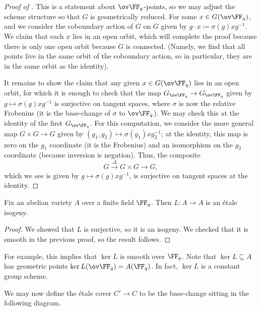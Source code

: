 \documentclass[../notes.tex]{subfiles}
\begin{document}
\begin{proof}[Proof of ]
	This is a statement about $\ov\FF_q$-points, so we may adjust the scheme structure so that $G$ is geometrically reduced. For some $x\in G(\ov\FF_q)$, and we consider the coboundary action of $G$ on $G$ given by $g\cdot x\coloneqq \sigma(g)xg^{-1}$. We claim that each $x$ lies in an open orbit, which will complete the proof because there is only one open orbit because $G$ is connected. (Namely, we find that all points live in the same orbit of the coboundary action, so in particular, they are in the same orbit as the identity).

	It remains to show the claim that any given $x\in G(\ov\FF_q)$ lies in an open orbit, for which it is enough to check that the map $G_{\ov\FF_q}\to G_{\ov\FF_q}$ given by $g\mapsto\sigma(g)xg^{-1}$ is surjective on tangent spaces, where $\sigma$ is now the relative Frobenius (it is the base-change of $\sigma$ to $\ov\FF_q$). We may check this at the identity of the first $G_{\ov\FF_q}$. For this computation, we consider the more general map $G\times G\to G$ given by $(g_1,g_2)\mapsto\sigma(g_1)xg_2^{-1}$; at the identity, this map is zero on the $g_1$ coordinate (it is the Frobenius) and an isomorphism on the $g_2$ coordinate (because inversion is negation). Thus, the composite
	\[G\stackrel\Delta\to G\times G\to G,\]
	which we see is given by $g\mapsto\sigma(g)xg^{-1}$, is surjective on tangent spaces at the identity.
\end{proof}
\begin{corollary}
	Fix an abelian variety $A$ over a finite field $\FF_q$. Then $L\colon A\to A$ is an \'etale isogeny.
\end{corollary}
\begin{proof}
	We showed that $L$ is surjective, so it is an isogeny. We checked that it is smooth in the previous proof, so the result follows.
\end{proof}
\begin{remark}
	For example, this implies that $\ker L$ is smooth over $\FF_q$. Note that $\ker L\subseteq A$ has geometric points $\ker L(\ov\FF_q)=A(\FF_q)$. In fact, $\ker L$ is a constant group scheme.
\end{remark}
We may now define the \'etale cover $C'\to C$ to be the base-change sitting in the following diagram.
\end{document}
